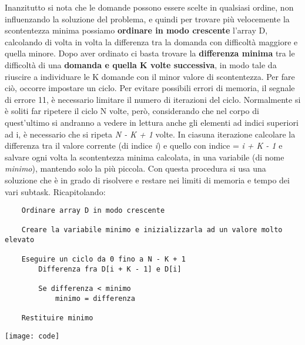 
Inanzitutto si nota che le domande possono essere scelte in qualsiasi ordine, non influenzando la soluzione del problema, e quindi per trovare più velocemente la  scontentezza minima possiamo \textbf{ordinare in modo crescente} l'array D, calcolando di volta in volta la differenza tra la domanda con difficoltà maggiore e quella minore.\newline
Dopo aver ordinato ci basta trovare la \textbf{differenza minima} tra le difficoltà di una \textbf{domanda e quella K volte successiva}, in modo tale da riuscire a individuare le K domande con il minor valore di scontentezza.\newline\newline
Per fare ciò, occorre impostare un ciclo. \newline
Per evitare possibili errori di memoria, il segnale di errore 11, è necessario limitare il numero di iterazioni del ciclo.\newline
Normalmente si è soliti far ripetere il ciclo N volte, però, considerando che nel corpo di quest'ultimo si andranno a vedere in lettura anche gli elementi ad indici superiori ad i, è necessario che si ripeta \textit{N - K + 1} volte.\newline
In ciasuna iterazione calcolare la  differenza tra il valore corrente (di indice \textit{i}) e quello con indice = \textit{i + K - 1} e salvare ogni volta la scontentezza minima calcolata, in una variabile (di nome \textit{minimo}), mantendo solo la più piccola.\newline
Con questa procedura si usa una soluzione che è in grado di risolvere e restare nei limiti di memoria e tempo dei vari subtask.
\newline\newline
Ricapitolando:
\begin{verbatim}
    Ordinare array D in modo crescente
    
    Creare la variabile minimo e inizializzarla ad un valore molto elevato
    
    Eseguire un ciclo da 0 fino a N - K + 1
        Differenza fra D[i + K - 1] e D[i]
        
        Se differenza < minimo
            minimo = differenza
    
    Restituire minimo
\end{verbatim}
\Code
\texttt{[image: code]}
